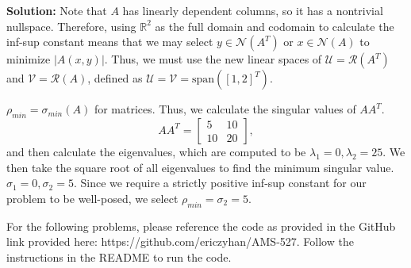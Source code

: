 \documentclass{article}
\theoremstyle{definition}
\theoremstyle{remark}
\newcommand{\R}{\mathbb{R}}
\begin{document}
\begin{enumerate}
\begin{enumerate}
        \textbf{Solution:} Note that \(A\) has linearly dependent columns, so it has a nontrivial nullspace. Therefore, using \(\R^{2}\) as the full domain and codomain to calculate the inf-sup constant means that we may select \(y\in \mathcal{N}(A^{T})\) or \(x\in \mathcal{N}(A)\) to minimize \(|A(x,y)|\). Thus, we must use the new linear spaces of \(\mathcal{U} = \mathcal{R}(A^{T})\) and \(\mathcal{V} = \mathcal{R}(A)\), defined as \(\mathcal{U} = \mathcal{V} = \text{span}\left(\left[1, 2\right]^{T}\right)\).

        \(\rho_{min} = \sigma_{min}(A)\) for matrices. Thus, we calculate the singular values of \(AA^{T}\).
        \[
            AA^{T} = \begin{bmatrix}
                        5 & 10 \\
                        10 & 20
                        \end{bmatrix}
        ,\]
        and then calculate the eigenvalues, which are computed to be \(\lambda_{1} = 0, \lambda_{2} = 25\). We then take the square root of all eigenvalues to find the minimum singular value. \(\sigma_{1} = 0, \sigma_{2} = 5\). Since we require a strictly positive inf-sup constant for our problem to be well-posed, we select \(\rho_{min} = \sigma_{2} = 5\).
        

        
    \end{enumerate}
\end{enumerate}

\newpage
For the following problems, please reference the code as provided in the GitHub link provided here: https://github.com/ericzyhan/AMS-527. Follow the instructions in the README to run the code.
\end{document}
